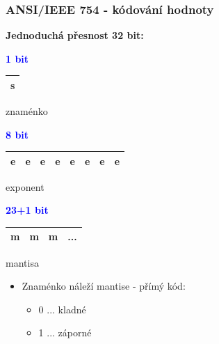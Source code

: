   \begin{frame}
    \frametitle{ANSI/IEEE 754 - kódování hodnoty}
    \boldmath
    \textbf{Jednoduchá přesnost 32 bit:}
    \vspace{3mm}
    
    \begin{minipage}[t][0.2\textheight][t]{0.15\textwidth}
    \begin{center}
      \textcolor{blue}{\textbf{1 bit}}
      
      \begin{tabular}{|c|}
      \hline
      s \\
      \hline
      \end{tabular}
      
      znaménko
    \end{center}
    \end{minipage}
    \begin{minipage}[t][0.2\textheight][t]{0.5\textwidth}
    \begin{center}
      \textcolor{blue}{\textbf{8 bit}}
      
      \begin{tabular}{|c|c|c|c|c|c|c|c|}
      \hline
      e & e & e & e & e & e & e & e \\
      \hline
      \end{tabular}
      
      exponent
    \end{center}
    \end{minipage}
    \begin{minipage}[t][0.2\textheight][t]{0.3\textwidth}
    \begin{center}
      \textcolor{blue}{\textbf{23+1 bit}}
      
      \begin{tabular}{|c|c|c|c}
      \hline
      m & m & m & ...\\
      \hline
      \end{tabular}
      
      mantisa
    \end{center}
    \end{minipage}
    
    \begin{itemize}
      \item Znaménko náleží mantise - přímý kód:
      
      \begin{itemize}
        \item 0 ... kladné
        \item 1 ... záporné
      \end{itemize}
      

\end{itemize}
\end{frame}
